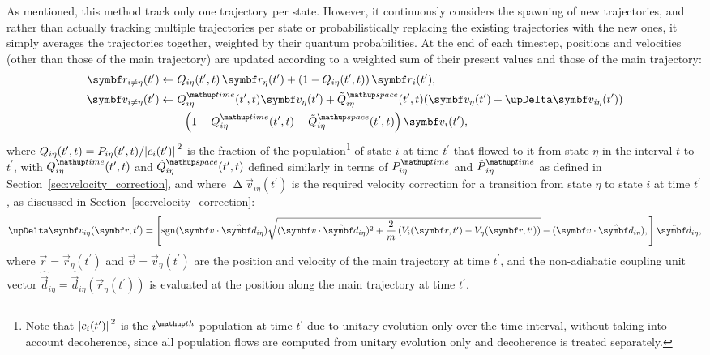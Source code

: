 As mentioned, this method track only one trajectory per state. However, it continuously considers the spawning of new trajectories, and rather than actually tracking multiple trajectories per state or probabilistically replacing the existing trajectories with the new ones, it simply averages the trajectories together, weighted by their quantum probabilities. At the end of each timestep, positions and velocities (other than those of the main trajectory) are updated according to a weighted sum of their present values and those of the main trajectory:
\begin{align}\label{eq:position_averaging}
\vec r_{i\neq\eta}(t^\prime) &\leftarrow 
  Q_{i\eta}(t^\prime, t)\,\vec r_\eta(t^\prime)
  + \left(1 - Q_{i\eta}(t^\prime, t)\right)\vec r_i(t^\prime),\\
\vec v_{i\neq\eta}(t^\prime) &\leftarrow
  Q^\up{time}_{i\eta}(t^\prime, t)\vec v_\eta(t^\prime)
  + \tilde Q^\up{space}_{i\eta}(t^\prime, t)(\vec v_\eta(t^\prime) + \upDelta \vec v_{i\eta}(t^\prime))\nonumber\\
  &\phantom{\rightarrow} + \left(1 - Q^\up{time}_{i\eta}(t^\prime, t) - \tilde Q^\up{space}_{i\eta}(t^\prime, t)\right)\vec v_i(t^\prime),
  \label{eq:velocity_averaging}
\end{align}
where $Q_{i\eta}(t^\prime, t) = P_{i\eta}(t^\prime, t)/\abs{c_i(t^\prime)}^2$ is the fraction of the population\footnote{Note that $\abs{c_i(t^\prime)}^2$ is the $i^\up{th}$ population at time $t^\prime$ due to unitary evolution only over the time interval, without taking into account decoherence, since all population flows are computed from unitary evolution only and decoherence is treated separately.} of state $i$ at time $t^\prime$ that flowed to it from state $\eta$ in the interval $t$ to $t^\prime$, with $Q_{i\eta}^\up{time}(t^\prime, t)$ and $\tilde Q_{i\eta}^\up{space}(t^\prime, t)$ defined similarly in terms of $P_{i\eta}^\up{time}$ and $\tilde P_{i\eta}^\up{time}$ as defined in Section~\ref{sec:velocity_correction}, and where $\upDelta \vec v_{i\eta}(t^\prime)$ is the required velocity correction for a transition from state $\eta$ to state $i$ at time $t^\prime$, as discussed in Section~\ref{sec:velocity_correction}:
\begin{align}\label{eq:non_markovian_velocity_jump}
\upDelta \vec v_{i\eta}(\vec r, t^\prime) = \left[\sgn(\vec v\cdot \hat{\vec d}_{i\eta})
\sqrt{(\vec v\cdot \hat{\vec d}_{i\eta})^2 + \frac2m\left(V_i(\vec r, t^\prime) - V_\eta(\vec r, t^\prime)\right)} - (\vec v\cdot \hat{\vec d}_{i\eta}),
\right]\hat{\vec d}_{i\eta},
\end{align}
where $\vec r = \vec r_\eta(t^\prime)$ and $\vec v = \vec v_\eta(t^\prime)$ are the position and velocity of the main trajectory at time $t^\prime$, and the non-adiabatic coupling unit vector $\hat{\vec d}_{i\eta} = \hat{\vec d}_{i\eta}(\vec r_\eta(t^\prime))$ is evaluated at the position along the main trajectory at time $t^\prime$.

